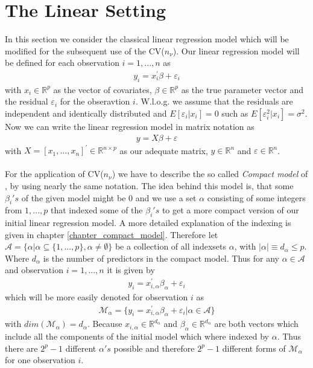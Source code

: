 \documentclass[Research_Module_ES.tex]{subfiles}
\begin{document}
\section{The Linear Setting}

In this section we consider the classical linear regression model which will be modified for the subsequent use of the CV($n_\nu$). Our linear regression model will be defined for each observation $i=1,...,n$ as
\begin{align*}
y_i=x_i^\prime\beta+\varepsilon_i
\end{align*}
with $x_i\in\mathbb{R}^p$ as the vector of covariates, $\beta\in\mathbb{R}^p$ as the true parameter vector and the residual $\varepsilon_i$ for the obseravtion $i$.
W.l.o.g. we assume that the residuals are independent and identically distributed and $E[\varepsilon_i|x_i]=0$ such as $E[\varepsilon_i^2|x_i]=\sigma^2$. Now we can write the linear regression model in matrix notation as
\begin{align*}
	y=X\beta+\varepsilon
\end{align*}
with $X=[x_1,...,x_n]^\prime\in\mathbb{R}^{n\times p}$ as our adequate matrix, $y\in\mathbb{R}^{n}$ and $\varepsilon\in\mathbb{R}^{n}$.
\\\\
For the application of CV($n_\nu$) we have to describe the so called \textit{Compact model} of \cite{shao}, by using nearly the same notation. The idea behind this model is, that some $\beta_i's$ of the given model might be $0$ and we use a set $\alpha$ consisting of some integers from $1,...,p$ that indexed some of the $\beta_i's$ to get a more compact version of our initial linear regression model. A more detailed explanation of the indexing is given in chapter \ref{chapter_compact_model}. Therefore let 
$\mathcal{A}=\{\alpha|\alpha\subseteq\{1,...,p\},\alpha\neq\emptyset\}$ be a collection of all indexsets $\alpha$, with 
$|\alpha|\equiv d_\alpha\leq p$. Where $d_\alpha$ is the number of predictors in the compact model. Thus for any $\alpha\in\mathcal{A}$ and observation $i=1,...,n$ it is given by
\begin{align*}
	y_i=x_{i,\alpha}^\prime\beta_\alpha+\varepsilon_i
\end{align*}
which will be more easily denoted for observation $i$ as
\begin{align*}
	\mathcal{M}_\alpha=\{y_i=x_{i,\alpha}^\prime\beta_\alpha+\varepsilon_i|\alpha\in\mathcal{A}\}
\end{align*}
with $dim(\mathcal{M}_\alpha)=d_\alpha$. Because $x_{i,\alpha}\in\mathbb{R}^{d_\alpha}$ and $\beta_\alpha\in\mathbb{R}^{d_\alpha}$ are both vectors which include all the components of the initial model which where indexed by $\alpha$. Thus there are $2^p-1$ different $\alpha's$ possible and therefore $2^p-1$ different forms of $\mathcal{M}_\alpha$ for one observation $i$.
\end{document}
